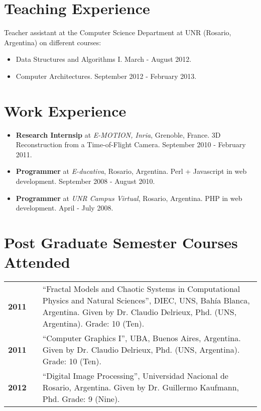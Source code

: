 \documentclass[a4paper,12pt]{article}
\begin{document}
\section*{Teaching Experience}

Teacher assistant at the Computer Science Department at UNR (Rosario, Argentina) on different courses:
\begin{itemize}
\item Data Structures and Algorithms I. March - August 2012.
\item Computer Architectures. September 2012 - February 2013.
\end{itemize}

\section*{Work Experience}

\begin{itemize}
\item {\bf Research Internsip} at {\em E-MOTION, Inria}, Grenoble, France. 3D Reconstruction from a Time-of-Flight Camera. September 2010 - February 2011.
\item {\bf Programmer} at {\em E-ducativa}, Rosario, Argentina. Perl + Javascript in web development. September 2008 - August 2010.
\item {\bf Programmer} at {\em UNR Campus Virtual}, Rosario, Argentina. PHP in web development. April - July 2008.
\end{itemize}


\section*{Post Graduate Semester Courses Attended}

\begin{tabular}{lcp{12 cm}}
\bf{2011}& & \textquotedblleft Fractal Models and Chaotic Systems in Computational Physics and Natural Sciences\textquotedblright, DIEC, UNS, Bah\'ia Blanca, Argentina. Given by Dr. Claudio Delrieux, Phd. (UNS, Argentina). Grade: 10 (Ten).\\
\bf{2011}& & \textquotedblleft Computer Graphics I\textquotedblright, UBA, Buenos Aires, Argentina. Given by Dr. Claudio Delrieux, Phd. (UNS, Argentina). Grade: 10 (Ten).\\
\bf{2012}& & \textquotedblleft Digital Image Processing\textquotedblright, Universidad Nacional de Rosario, Argentina. Given by Dr. Guillermo Kaufmann, Phd. Grade: 9 (Nine).\\
\end{tabular}
\end{document}
